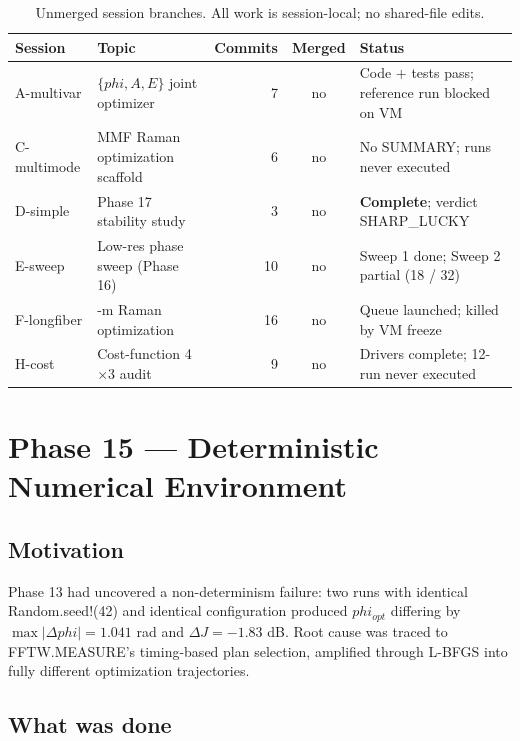 \documentclass[11pt,letterpaper]{article}
\def\varphi{phi}%
\def\mathrm#1{#1}%
\def\texttt#1{#1}%
\begin{document}
\begin{table}[H]
\centering
\small
\begin{tabular}{>{\raggedright\arraybackslash}p{2.3cm}>{\raggedright\arraybackslash}p{5.2cm}rc>{\raggedright\arraybackslash}p{5.8cm}}
\toprule
Session & Topic & Commits & Merged & Status \\
\midrule
A-multivar   & $\{\varphi, A, E\}$ joint optimizer      & 7  & no & Code $+$ tests pass; reference run blocked on VM \\
C-multimode  & MMF Raman optimization scaffold          & 6  & no & No SUMMARY; runs never executed \\
D-simple     & Phase 17 stability study                 & 3  & no & \textbf{Complete}; verdict SHARP\_LUCKY \\
E-sweep      & Low-res phase sweep (Phase 16)           & 10 & no & Sweep 1 done; Sweep 2 partial (18 / 32) \\
F-longfiber  & 100-m Raman optimization                 & 16 & no & Queue launched; killed by VM freeze \\
H-cost       & Cost-function 4$\times$3 audit           & 9  & no & Drivers complete; 12-run never executed \\
\bottomrule
\end{tabular}
\caption{Unmerged session branches. All work is session-local; no shared-file edits.}
\end{table}

\newpage
\section{Phase 15 --- Deterministic Numerical Environment}
\label{sec:phase15}

\subsection{Motivation}

Phase 13 had uncovered a non-determinism failure: two runs with identical \texttt{Random.seed!(42)} and identical configuration produced $\varphi_{\mathrm{opt}}$ differing by $\max|\Delta\varphi| = 1.041$ rad and $\Delta J = -1.83$ dB. Root cause was traced to \texttt{FFTW.MEASURE}'s timing-based plan selection, amplified through L-BFGS into fully different optimization trajectories.

\subsection{What was done}
\end{document}
